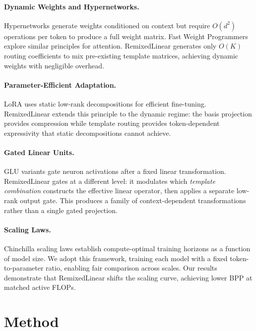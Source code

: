 \documentclass[11pt]{article}
\begin{document}
\paragraph{Dynamic Weights and Hypernetworks.}
Hypernetworks \citep{ha2016hypernetworks} generate weights conditioned on context but require $O(d^2)$ operations per token to produce a full weight matrix. Fast Weight Programmers \citep{schlag2021linear} explore similar principles for attention. RemixedLinear generates only $O(K)$ routing coefficients to mix pre-existing template matrices, achieving dynamic weights with negligible overhead.

\paragraph{Parameter-Efficient Adaptation.}
LoRA \citep{hu2021lora} uses static low-rank decompositions for efficient fine-tuning. RemixedLinear extends this principle to the dynamic regime: the basis projection provides compression while template routing provides token-dependent expressivity that static decompositions cannot achieve.

\paragraph{Gated Linear Units.}
GLU variants \citep{dauphin2017language, shazeer2020glu} gate neuron activations after a fixed linear transformation. RemixedLinear gates at a different level: it modulates which \emph{template combination} constructs the effective linear operator, then applies a separate low-rank output gate. This produces a family of context-dependent transformations rather than a single gated projection.

\paragraph{Scaling Laws.}
Chinchilla scaling laws \citep{hoffmann2022training} establish compute-optimal training horizons as a function of model size. We adopt this framework, training each model with a fixed token-to-parameter ratio, enabling fair comparison across scales. Our results demonstrate that RemixedLinear shifts the scaling curve, achieving lower BPP at matched active FLOPs.

\section{Method}
\end{document}
